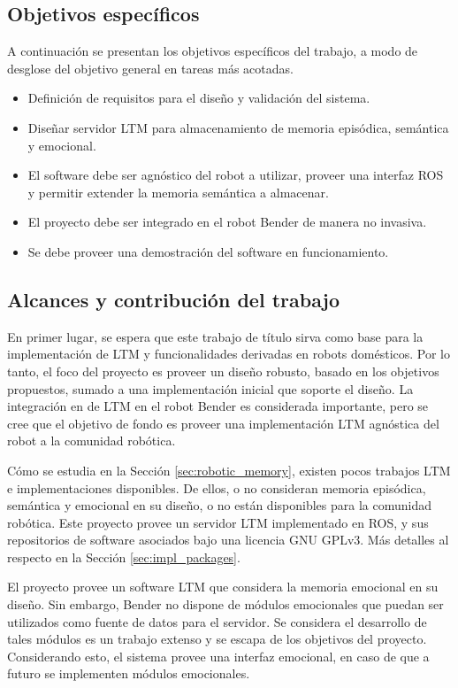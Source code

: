 \subsection{Objetivos específicos}

A continuación se presentan los objetivos específicos del trabajo, a modo de desglose del objetivo general en tareas más acotadas.
\begin{itemize}
	\item Definición de requisitos para el diseño y validación del sistema.
	\item Diseñar servidor LTM para almacenamiento de memoria episódica, semántica y emocional.
	\item El software debe ser agnóstico del robot a utilizar, proveer una interfaz ROS y permitir extender la memoria semántica a almacenar.
	\item El proyecto debe ser integrado en el robot Bender de manera no invasiva.
	\item Se debe proveer una demostración del software en funcionamiento.
\end{itemize}

\subsection{Alcances y contribución del trabajo}

En primer lugar, se espera que este trabajo de título sirva como base para la implementación de LTM y funcionalidades derivadas en robots domésticos. Por lo tanto, el foco del proyecto es proveer un diseño robusto, basado en los objetivos propuestos, sumado a una implementación inicial que soporte el diseño. La integración en de LTM en el robot Bender es considerada importante, pero se cree que el objetivo de fondo es proveer una implementación LTM agnóstica del robot a la comunidad robótica.

Cómo se estudia en la Sección \ref{sec:robotic_memory}, existen pocos trabajos LTM e implementaciones disponibles. De ellos, o no consideran memoria episódica, semántica y emocional en su diseño, o no están disponibles para la comunidad robótica. Este proyecto provee un servidor LTM implementado en ROS, y sus repositorios de software asociados bajo una licencia GNU GPLv3. Más detalles al respecto en la Sección \ref{sec:impl_packages}.

El proyecto provee un software LTM que considera la memoria emocional en su diseño. Sin embargo, Bender no dispone de módulos emocionales que puedan ser utilizados como fuente de datos para el servidor. Se considera el desarrollo de tales módulos es un trabajo extenso y se escapa de los objetivos del proyecto. Considerando esto, el sistema provee una interfaz emocional, en caso de que a futuro se implementen módulos emocionales.

